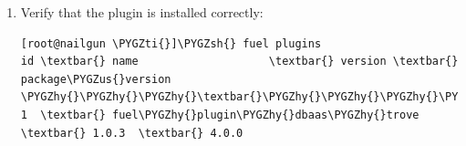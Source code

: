 \documentclass[letterpaper,10pt,english]{sphinxmanual}
\def\PYGZus{\char`\_}
\def\PYGZsh{\char`\#}
\def\PYGZhy{\char`\-}
\def\PYGZti{\char`\~}
\begin{document}
\begin{enumerate}
\begin{Verbatim}[commandchars=\\\{\}]
[root@fuel \PYGZti{}]\PYGZsh{} fuel plugins \PYGZhy{}\PYGZhy{}install fuel\PYGZhy{}plugin\PYGZhy{}dbaas\PYGZhy{}trove\PYGZhy{}1.0\PYGZhy{}1.0.3\PYGZhy{}1.noarch.rpm
\end{Verbatim}

\item {} 
Verify that the plugin is installed correctly:

\begin{Verbatim}[commandchars=\\\{\}]
[root@nailgun \PYGZti{}]\PYGZsh{} fuel plugins
id \textbar{} name                    \textbar{} version \textbar{} package\PYGZus{}version
\PYGZhy{}\PYGZhy{}\PYGZhy{}\textbar{}\PYGZhy{}\PYGZhy{}\PYGZhy{}\PYGZhy{}\PYGZhy{}\PYGZhy{}\PYGZhy{}\PYGZhy{}\PYGZhy{}\PYGZhy{}\PYGZhy{}\PYGZhy{}\PYGZhy{}\PYGZhy{}\PYGZhy{}\PYGZhy{}\PYGZhy{}\PYGZhy{}\PYGZhy{}\PYGZhy{}\PYGZhy{}\PYGZhy{}\PYGZhy{}\PYGZhy{}\PYGZhy{}\textbar{}\PYGZhy{}\PYGZhy{}\PYGZhy{}\PYGZhy{}\PYGZhy{}\PYGZhy{}\PYGZhy{}\PYGZhy{}\PYGZhy{}\textbar{}\PYGZhy{}\PYGZhy{}\PYGZhy{}\PYGZhy{}\PYGZhy{}\PYGZhy{}\PYGZhy{}\PYGZhy{}\PYGZhy{}\PYGZhy{}\PYGZhy{}\PYGZhy{}\PYGZhy{}\PYGZhy{}\PYGZhy{}\PYGZhy{}
1  \textbar{} fuel\PYGZhy{}plugin\PYGZhy{}dbaas\PYGZhy{}trove \textbar{} 1.0.3  \textbar{} 4.0.0
\end{Verbatim}

\end{enumerate}
\end{document}
